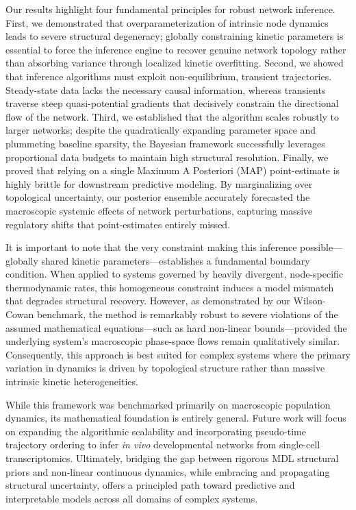 \documentclass[10pt, aps, rmp,  twocolumn, superscriptaddress, floatfix, showkeys]{revtex4-2}
\begin{document}
Our results highlight four fundamental principles for robust network inference. First, we demonstrated that overparameterization of intrinsic node dynamics leads to severe structural degeneracy; globally constraining kinetic parameters is essential to force the inference engine to recover genuine network topology rather than absorbing variance through localized kinetic overfitting. Second, we showed that inference algorithms must exploit non-equilibrium, transient trajectories. Steady-state data lacks the necessary causal information, whereas transients traverse steep quasi-potential gradients that decisively constrain the directional flow of the network. Third, we established that the algorithm scales robustly to larger networks; despite the quadratically expanding parameter space and plummeting baseline sparsity, the Bayesian framework successfully leverages proportional data budgets to maintain high structural resolution. Finally, we proved that relying on a single Maximum A Posteriori (MAP) point-estimate is highly brittle for downstream predictive modeling. By marginalizing over topological uncertainty, our posterior ensemble accurately forecasted the macroscopic systemic effects of network perturbations, capturing massive regulatory shifts that point-estimates entirely missed.

It is important to note that the very constraint making this inference possible---globally shared kinetic parameters---establishes a fundamental boundary condition. When applied to systems governed by heavily divergent, node-specific thermodynamic rates, this homogeneous constraint induces a model mismatch that degrades structural recovery. However, as demonstrated by our Wilson-Cowan benchmark, the method is remarkably robust to severe violations of the assumed mathematical equations---such as hard non-linear bounds---provided the underlying system's macroscopic phase-space flows remain qualitatively similar. Consequently, this approach is best suited for complex systems where the primary variation in dynamics is driven by topological structure rather than massive intrinsic kinetic heterogeneities. 

While this framework was benchmarked primarily on macroscopic population dynamics, its mathematical foundation is entirely general. Future work will focus on expanding the algorithmic scalability and incorporating pseudo-time trajectory ordering to infer \textit{in vivo} developmental networks from single-cell transcriptomics. Ultimately, bridging the gap between rigorous MDL structural priors and non-linear continuous dynamics, while embracing and propagating structural uncertainty, offers a principled path toward predictive and interpretable models across all domains of complex systems.
\end{document}
